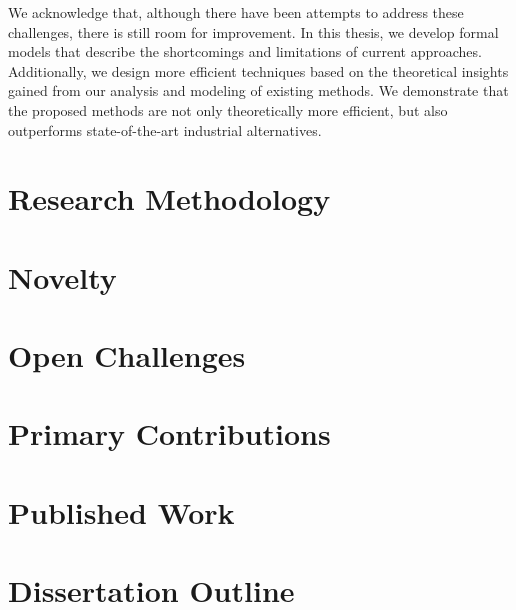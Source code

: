 We acknowledge that, although there have been attempts to address these challenges, there is still room for improvement. In this thesis, we develop formal models that describe the shortcomings and limitations of current approaches. Additionally, we design more efficient techniques based on the theoretical insights gained from our analysis and modeling of existing methods. We demonstrate that the proposed methods are not only theoretically more efficient, but also outperforms state-of-the-art industrial alternatives.

\section{Research Methodology}


\section{Novelty}


\section{Open Challenges}
\label{thesis-intro-challenges}


\section{Primary Contributions}
\label{thesis-intro-contributions}


\section{Published Work}


\section{Dissertation Outline}
